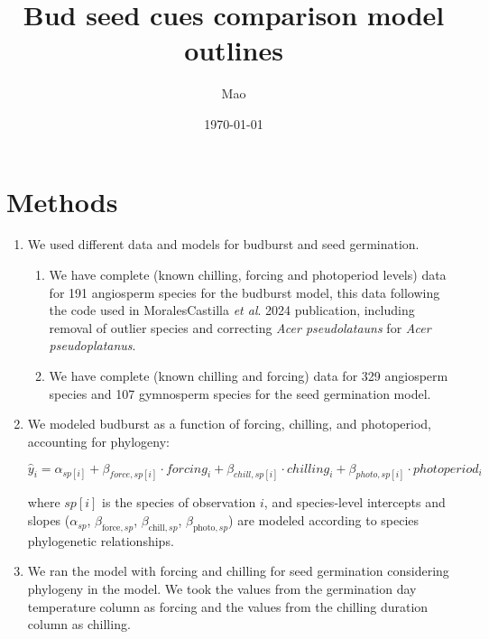 \documentclass{article}
\begin{document}


\title{Bud seed cues comparison model outlines}
\author{Mao}
\date{\today}
\maketitle

\section{Methods}
\begin{enumerate}
\item We used different data and models for budburst and seed germination.
\begin{enumerate}
\item We have complete (known chilling, forcing and photoperiod levels) data for 191 angiosperm species for the budburst model, this data following the code used in MoralesCastilla \textit{et al}. 2024 publication, including removal of outlier species and correcting \textit{Acer pseudolatauns} for \textit{Acer pseudoplatanus}. %

\item We have complete (known chilling and forcing) data for 329 angiosperm species and 107 gymnosperm species for the seed germination model. %
\end{enumerate}
\item We modeled budburst as a function of forcing, chilling, and photoperiod, accounting for phylogeny: 

\[
\hat{y}_i = \alpha_{sp[i]} + \beta_{force,sp[i]} \cdot forcing_i + \beta_{chill,sp[i]} \cdot chilling_i + \beta_{photo,sp[i]} \cdot photoperiod_i
\]

where $sp[i]$ is the species of observation $i$, and species-level intercepts and slopes ($\alpha_{sp}$, $\beta_{\text{force},sp}$, $\beta_{\text{chill},sp}$, $\beta_{\text{photo},sp}$) are modeled according to species phylogenetic relationships.

\item We ran the model with forcing and chilling for seed germination considering phylogeny in the model. We took the values from the germination day temperature column as forcing and the values from the chilling duration column as chilling.


\end{enumerate}
\end{document}

